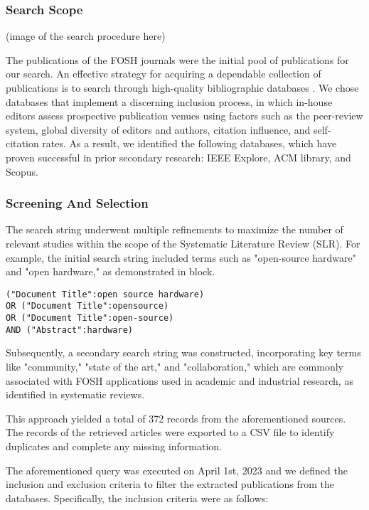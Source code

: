 \subsubsection{Search Scope}
(image of the search procedure here)


The publications of the FOSH journals were the initial pool of publications for our search. An effective strategy for acquiring a dependable collection of publications is to search through high-quality bibliographic databases \cite{petersen2015guidelines}. We chose databases that implement a discerning inclusion process, in which in-house editors assess prospective publication venues using factors such as the peer-review system, global diversity of editors and authors, citation influence, and self-citation rates. As a result, we identified the following databases, which have proven successful in prior secondary research: IEEE Explore, ACM library, and Scopus.

\subsubsection{Screening And Selection}
The search string underwent multiple refinements to maximize the number of relevant studies within the scope of the Systematic Literature Review (SLR). For example, the initial search string included terms such as "open-source hardware" and "open hardware," as demonstrated in block. 
\par
\begin{lstlisting}
("Document Title":open source hardware)
OR ("Document Title":opensource)
OR ("Document Title":open-source)
AND ("Abstract":hardware)
\end{lstlisting}
Subsequently, a secondary search string was constructed, incorporating key terms like "community," "state of the art," and "collaboration," which are commonly associated with FOSH applications used in academic and industrial research, as identified in systematic reviews.

This approach yielded a total of 372 records from the aforementioned sources. The records of the retrieved articles were exported to a CSV file to identify duplicates and complete any missing information.

The aforementioned query was executed on April 1st, 2023 and we defined the inclusion and exclusion criteria to filter the extracted publications from the databases. Specifically, the inclusion criteria were as follows:

